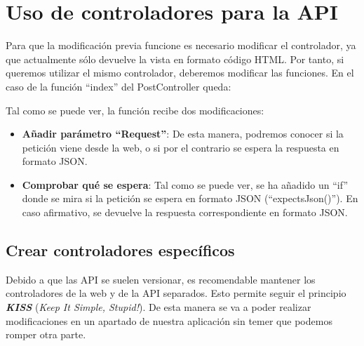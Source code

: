 
\chapter{Uso de controladores para la API}

Para que la modificación previa funcione es necesario modificar el controlador, ya que actualmente sólo devuelve la vista en formato código HTML. Por tanto, si queremos utilizar el mismo controlador, deberemos modificar las funciones. En el caso de la función “index” del PostController queda:



Tal como se puede ver, la función recibe dos modificaciones:

\begin{itemize}
    \item \textbf{Añadir parámetro “Request”}: De esta manera, podremos conocer si la petición viene desde la web, o si por el contrario se espera la respuesta en formato JSON.

    \item \textbf{Comprobar qué se espera}: Tal como se puede ver, se ha añadido un “if” donde se mira si la petición se espera en formato JSON (“expectsJson()”). En caso afirmativo, se devuelve la respuesta correspondiente en formato JSON.
\end{itemize}




\section{Crear controladores específicos}

Debido a que las API se suelen versionar, es recomendable mantener los controladores de la web y de la API separados. Esto permite seguir el principio \textbf{\textit{KISS}} (\textit{Keep It Simple, Stupid!}). De esta manera se va a poder realizar modificaciones en un apartado de nuestra aplicación sin temer que podemos romper otra parte.

